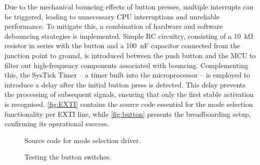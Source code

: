 \documentclass[12pt]{article}
\numberwithin{subsubsubsection}{subsubsection}
\begin{document}
Due to the mechanical bouncing effects of button presses, multiple interrupts can be triggered, leading to unnecessary CPU interruptions and unreliable performance. To mitigate this, a combination of hardware and software debouncing strategies is implemented. Simple RC circuitry, consisting of a \SI{10}{\kilo\ohm} resistor in series with the button and a \SI{100}{\nano\farad} capacitor connected from the junction point to ground, is introduced between the push button and the MCU to filter out high-frequency components associated with bouncing. Complementing this, the SysTick Timer – a timer built into the microprocessor – is employed to introduce a delay after the initial button press is detected. This delay prevents the processing of subsequent signals, ensuring that only the first stable activation is recognised. \autoref{fig:EXTI} contains the source code essential for the mode selection functionality per EXTI line, while \autoref{fig:button} presents the breadboarding setup, confirming its operational success.

\begin{figure}[H]
    \centering
    \caption{Source code for mode selection driver.}
    \label{fig:EXTI}
\end{figure}


\begin{figure}[H]
    \centering
    \caption{Testing the button switches.}
    \label{fig:button}
\end{figure}
\end{document}
